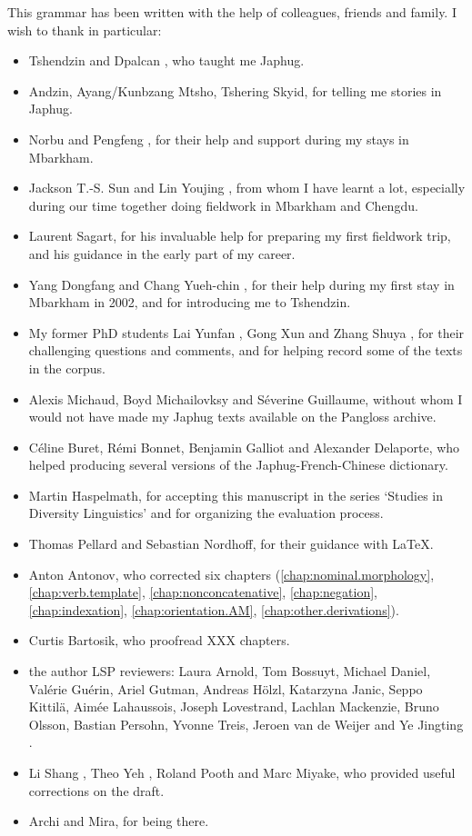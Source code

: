 %
%

This grammar has been written with the help of colleagues, friends and family. I wish to thank in particular:

\begin{itemize}
	\item Tshendzin  and  Dpalcan , who taught me Japhug.
	\item Andzin, Ayang/Kunbzang Mtsho,   Tshering Skyid, for telling me stories in Japhug.
	\item Norbu  and Pengfeng , for their help and support during my stays in Mbarkham.
	\item Jackson T.-S. Sun  and Lin Youjing , from whom I have learnt a lot, especially during our time together doing fieldwork in Mbarkham and Chengdu.	
	\item Laurent Sagart, for his invaluable help for preparing my first fieldwork trip, and his guidance in the early part of my career.
	\item 	Yang Dongfang  and Chang Yueh-chin , for their help during my first stay in Mbarkham in 2002, and for introducing me to Tshendzin.
	\item My former PhD students Lai Yunfan , Gong Xun  and Zhang Shuya , for their challenging questions and comments, and for helping record some of the texts in the corpus.
	\item Alexis Michaud, Boyd Michailovksy and Séverine Guillaume, without whom I would not have made my Japhug texts available on the Pangloss archive.
	\item Céline Buret, Rémi Bonnet, Benjamin Galliot and Alexander Delaporte, who helped producing several versions of the Japhug-French-Chinese dictionary.
	\item Martin Haspelmath, for accepting this manuscript in the series `Studies in Diversity Linguistics' and for organizing the evaluation process.
	\item Thomas Pellard and Sebastian Nordhoff, for their guidance with \LaTeX.
	\item Anton Antonov, who corrected six chapters (\ref{chap:nominal.morphology}, \ref{chap:verb.template}, \ref{chap:nonconcatenative}, \ref{chap:negation}, \ref{chap:indexation}, \ref{chap:orientation.AM}, \ref{chap:other.derivations}).
	\item Curtis Bartosik, who proofread XXX chapters.
	\item the author LSP reviewers: Laura Arnold, Tom Bossuyt, Michael Daniel, Valérie Guérin, Ariel Gutman, Andreas Hölzl, Katarzyna Janic, Seppo Kittilä, Aimée Lahaussois, Joseph Lovestrand, Lachlan Mackenzie, Bruno Olsson, Bastian Persohn, Yvonne Treis, Jeroen van de Weijer and Ye Jingting  .
	\item Li Shang , Theo Yeh , Roland Pooth and Marc Miyake, who provided useful corrections on the draft.
	\item Archi and Mira, for being there.
\end{itemize}
